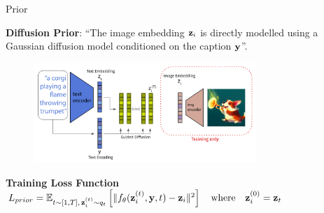 \documentclass[aspectratio=169, 9pt]{beamer}
\theoremstyle{definition}
\begin{document}
\begin{frame}{Prior}
  \begin{center}
    \textbf{Diffusion Prior}: ``The image embedding ${\mathbf{z}}_i$ is directly modelled 
    using a Gaussian diffusion model conditioned on the caption ${\mathbf{y}}$''.
  \end{center}
  \begin{figure}[h!]
    \centering
    \includegraphics[width=0.75\textwidth]{./pic/dalle-prior.png}
  \end{figure}
  \textbf{Training Loss Function}
  \(
    L_{prior} = \mathbb{E}_{t\sim \left[ 1,T \right],\, {\mathbf{z}}_i^{(t)} \sim q_t}
    \left[\|f_\theta({\mathbf{z}}_i^{(t)},{\mathbf{y}},t) - {\mathbf{z}}_i\|^2  \right]
    \quad\mbox{where}\quad {\mathbf{z}}_i^{(0)} = {\mathbf{z}}_t
  \)
\end{frame}
\end{document}
